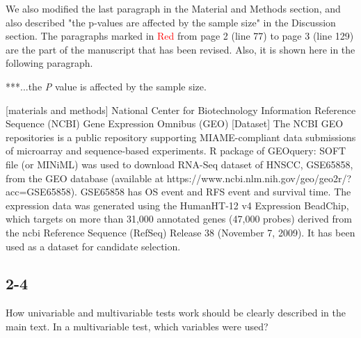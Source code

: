 \documentclass[preprint,12pt]{elsarticle}
\newenvironment{MyColorPar}[1]{%
    \leavevmode\color{#1}\ignorespaces%
}{%
}%
\begin{document}
\begin{MyColorPar}{blue}



We also modified the last paragraph in the Material and Methods section, and also described "the p-values are affected by the sample size" in the Discussion section.
The paragraphs marked in \textcolor{red}{Red} from page 2 (line 77) to page 3 (line 129) are the part of the manuscript that has been revised. Also, it is shown here in the following paragraph.
\\[0.3cm]

\begin{MyColorPar}{red}

***...the \textit{P} value is affected by the sample size. %



[materials and methods]
National Center for Biotechnology Information Reference Sequence (NCBI) 
Gene Expression Omnibus (GEO)
[Dataset]
The NCBI GEO repositories is a public repository supporting MIAME-compliant data submissions of microarray and sequence-based experiments.
R package of GEOquery\cite{Sean2007}: SOFT file (or MINiML) was used to
download RNA-Seq dataset of HNSCC, GSE65858, from the GEO database (available at https://www.ncbi.nlm.nih.gov/geo/geo2r/?acc=GSE65858). 
GSE65858\cite{Wichmann2015} has OS event and RFS event and survival time.
The expression data was generated using the HumanHT-12 v4 Expression BeadChip, which targets on more than 31,000 annotated genes (47,000 probes) derived from the \acrfull{ncbi} Reference Sequence (RefSeq) Release 38 (November 7, 2009).
It has been used as a dataset for candidate selection. \\

\end{MyColorPar} %


\end{MyColorPar} %



\subsection*{2-4} %
How univariable and multivariable tests work should be clearly described in the main text. In a multivariable test, which variables were used?
\end{document}
